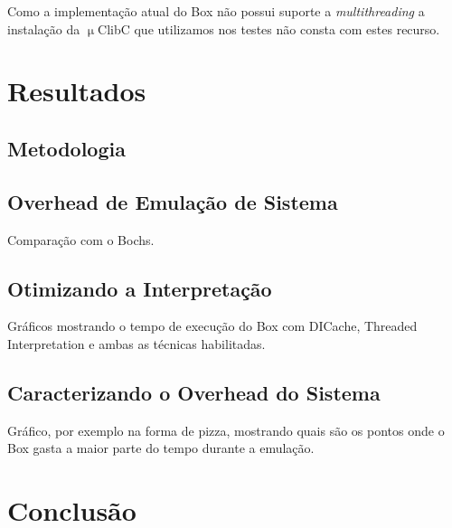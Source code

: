 \documentclass[11pt,twoside]{article}
\begin{document}
Como a implementação atual do Box não possui suporte a 
\textit{multithreading} a instalação da $\upmu$ClibC que utilizamos
nos testes não consta com estes recurso.


\section{Resultados} \label{sec:resultados}

\subsection{Metodologia}

\subsection{Overhead de Emulação de Sistema}

Comparação com o Bochs.

\subsection{Otimizando a Interpretação}

Gráficos mostrando o tempo de execução do Box com DICache, Threaded Interpretation
e ambas as técnicas habilitadas.

\subsection{Caracterizando o Overhead do Sistema}

Gráfico, por exemplo na forma de pizza, mostrando quais são os pontos onde o Box
gasta a maior parte do tempo durante a emulação.







\section{Conclusão}  \label{sec:conclusao}




\newpage

\end{document}
